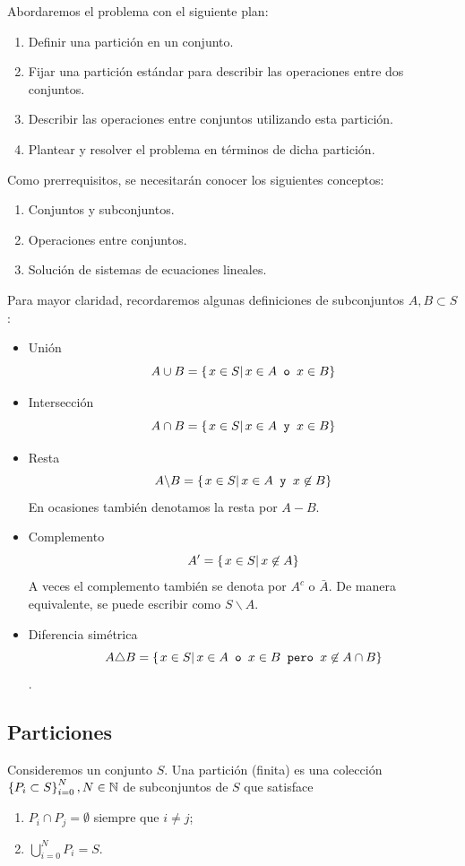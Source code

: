 Abordaremos el problema con el siguiente plan:
\begin{enumerate}
	\item Definir una partición en un conjunto.
	\item Fijar una partición estándar para describir las operaciones entre dos conjuntos. 
	\item Describir las operaciones entre conjuntos utilizando esta partición.
	\item Plantear y resolver el problema en términos de dicha partición. 
\end{enumerate}

Como prerrequisitos, se necesitarán conocer los siguientes conceptos:
\begin{enumerate}
	\item  Conjuntos y subconjuntos.
	\item Operaciones entre conjuntos.
	\item Solución de sistemas de ecuaciones lineales. 
\end{enumerate}

Para mayor claridad, recordaremos algunas definiciones de subconjuntos $ A,B \subset S $:
\begin{itemize}
	\item Unión
	\[ A\cup B = \left\{ \left.x\in S \right| x \in A \texttt{ o } x \in B \right\} \]
	\item Intersección
	\[ A\cap B = \left\{ \left.x \in S \right| x\in A \texttt{ y } x\in B \right\}\]
	\item Resta  
	\[ A\backslash B = \left\{ \left.x\in S \right| x\in A \texttt{ y } x\not \in B \right\}\]
	En ocasiones también denotamos la resta por $ A-B $. 
	\item Complemento
	\[ A' = \left\{ \left.x\in S \right| x\not \in A \right\} \]
	A veces el complemento también se denota por $ A^{c} $ o $ \bar{A} $. De manera equivalente, se puede escribir como $ S\backslash A.$
	\item Diferencia simétrica
	\[ A\triangle B = \left\{ \left.x \in S \right| x\in A \texttt{ o } x\in B \texttt{ pero } x\not \in A\cap B \right\}\]. 
\end{itemize}



\subsection{Particiones}

Consideremos un conjunto $ S $. Una partición (finita) es una colección $ \left\{ P_i \subset S \right\}_{i=0}^{N}, N \in \mathbb{N} $ de subconjuntos de $ S $ que satisface
\begin{enumerate}
	\item $ P_i \cap P_j =\emptyset $ siempre que $ i\neq j $;
	\item $ \bigcup_{i=0}^{N} P_i = S $. 
\end{enumerate}

